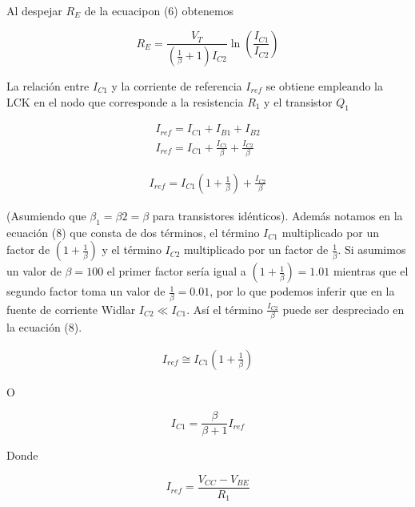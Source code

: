 \documentclass[12pt]{article}
\begin{document}
	\noindent Al despejar $R_E$ de la ecuacipon (6) obtenemos
	\begin{tcolorbox}[colback=red!5!white,colframe=red!75!black,arc=0mm,boxrule=0mm,width=(\linewidth+0.5cm)]
		\begin{equation}
			R_E = \frac{V_T}{\left( \frac{1}{\beta} + 1 \right)I_{C2}}\ln \left( \frac{I_{C1}}{I_{C2}} \right)	
		\end{equation}
	\end{tcolorbox}
	
	\noindent La relación entre $I_{C1}$ y la corriente de referencia $I_{ref}$ se obtiene empleando la LCK en el nodo que corresponde a la resistencia $R_1$ y el transistor $Q_1$
	
	\begin{align*}
		I_{ref} = I_{C1} + I_{B1} + I_{B2}\\
		I_{ref} = I_{C1} + \frac{I_{C1}}{\beta} + \frac{I_{C2}}{\beta}
	\end{align*}
	
	\begin{align}
		I_{ref} = I_{C1}\left( 1 + \frac{1}{\beta} \right) + \frac{I_{C2}}{\beta}
	\end{align}
	
	\noindent (Asumiendo que $\beta_1 = \beta2 = \beta$ para transistores idénticos). Además notamos en la ecuación (8) que consta de dos términos, el término $I_{C1}$ multiplicado por un factor de $\left( 1 + \frac{1}{\beta} \right) $ y el término $I_{C2}$ multiplicado por un factor de $\frac{1}{\beta}$. Si asumimos un valor de $\beta=100$ el primer factor sería igual a $\left( 1 + \frac{1}{\beta} \right) = 1.01$ mientras que el segundo factor toma un valor de $\frac{1}{\beta} = 0.01$, por lo que podemos inferir que en la fuente de corriente Widlar $I_{C2}  \ll I_{C1}$. Así el término $\frac{I_{C2}}{\beta}$ puede ser despreciado en la ecuación (8).
	
	\begin{align}
		I_{ref} \cong I_{C1}\left( 1 + \frac{1}{\beta} \right)
	\end{align}
	
	\noindent O
	\begin{tcolorbox}[colback=red!5!white,colframe=red!75!black,arc=0mm,boxrule=0mm,width=(\linewidth+0.5cm)]
		\begin{equation}
			I_{C1} = \frac{\beta}{\beta + 1}I_{ref}
		\end{equation}
	\end{tcolorbox}
	
	\noindent Donde
	\begin{tcolorbox}[colback=red!5!white,colframe=red!75!black,arc=0mm,boxrule=0mm,width=(\linewidth+0.5cm)]
		\begin{equation}
			I_{ref} = \frac{V_{CC} - V_{BE}}{R_1}
		\end{equation}
	\end{tcolorbox}
	
\end{document}
